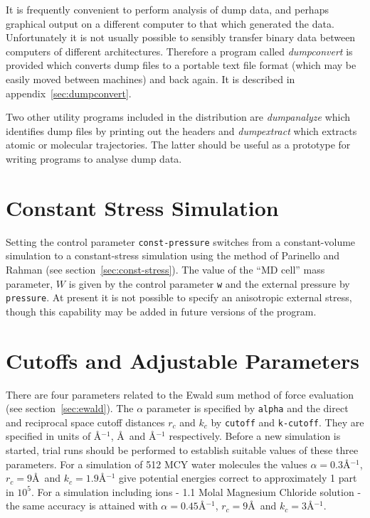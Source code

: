 It is frequently convenient to perform analysis of dump data, and
perhaps graphical output on a different computer to that which
generated the data.  Unfortunately it is not usually possible to
sensibly transfer binary data between computers of different
architectures.  Therefore a program called {\em dumpconvert} is
provided which converts dump files to a portable text file format
(which may be easily moved between machines) and back again. It is
described in appendix~\ref{sec:dumpconvert}.

Two other utility programs included in the distribution are {\em
dumpanalyze} which identifies dump files by printing out the headers
and {\em dumpextract} which extracts atomic or molecular trajectories.
The latter should be useful as a prototype for writing programs to
analyse dump data.

\section{Constant Stress Simulation}

Setting  the control parameter   \verb'const-pressure' switches from a
constant-volume  simulation to a constant-stress  simulation using the
method     of    Parinello     and    Rahman\cite{parinello:81}   (see
section~\ref{sec:const-stress}).   The value of  the  ``MD cell'' mass
parameter,  $W$  is given by the control  parameter \verb'w'  and  the
external pressure by \verb'pressure'. At present it is not possible to
specify an anisotropic external stress, though this  capability may be
added in future versions of the program.

\section{Cutoffs and Adjustable Parameters}

There are four parameters related to the Ewald sum method of force
evaluation (see section~\ref{sec:ewald}).  The $\alpha$ parameter is
specified by \verb'alpha' and the direct and reciprocal space cutoff
distances $r_{c}$ and $k_{c}$ by \verb'cutoff' and \verb'k-cutoff'.
They are specified in units of \AA$^{-1}$, \AA\ and \AA$^{-1}$
respectively.  Before a new simulation is started, trial runs should
be performed to establish suitable values of these three parameters.
For a simulation of 512 MCY water molecules the values $\alpha =
0.3$\AA$^{-1}$, $r_{c} = 9$\AA\ and $k_{c} = 1.9$\AA$^{-1}$ give
potential energies correct to approximately 1 part in $10^{5}$. For a
simulation including ions - 1.1 Molal Magnesium Chloride solution -
the same accuracy is attained with $\alpha = 0.45$\AA$^{-1}$, $r_{c} =
9$\AA\ and $k_{c} = 3$\AA$^{-1}$.

